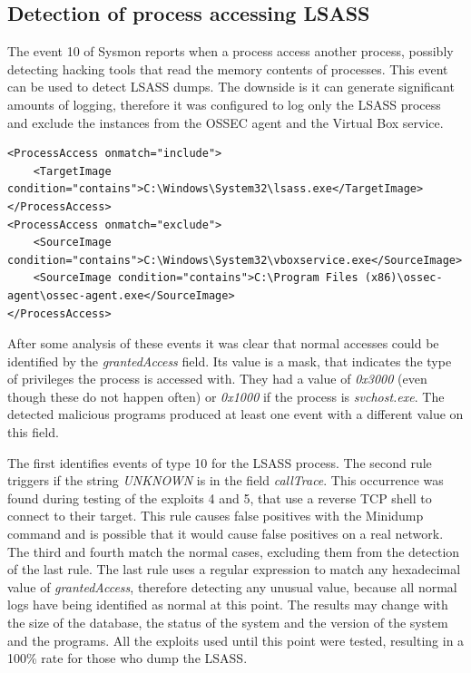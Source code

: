 \subsection{Detection of process accessing LSASS} \label{detect_lsass}
The event 10 of Sysmon reports when a process access another process, possibly detecting hacking tools that read the memory contents of processes\cite{sysmon}.
This event can be used to detect LSASS dumps\cite{sysmon_event_10_lsass}.
\linej
The downside is it can generate significant amounts of logging, therefore it was configured to log only the LSASS process and exclude the instances from the OSSEC agent and the Virtual Box service.
\linej
\begin{lstlisting}[style=xml,caption=Sysmon monitoring with event 10 for LSASS reads,captionpos=b]
<ProcessAccess onmatch="include">
	<TargetImage condition="contains">C:\Windows\System32\lsass.exe</TargetImage>
</ProcessAccess>
<ProcessAccess onmatch="exclude">
	<SourceImage condition="contains">C:\Windows\System32\vboxservice.exe</SourceImage>
	<SourceImage condition="contains">C:\Program Files (x86)\ossec-agent\ossec-agent.exe</SourceImage>
</ProcessAccess>
\end{lstlisting}
\linej
After some analysis of these events it was clear that normal accesses could be identified by the \textit{grantedAccess} field. Its value is a mask, that indicates the type of privileges the process is accessed with.
\linej
They had a value of \textit{0x3000} (even though these do not happen often) or \textit{0x1000} if the process is \textit{svchost.exe}. The detected malicious programs produced at least one event with a different value on this field.
\linej

\linej
The first identifies events of type 10 for the LSASS process.
\linej
The second rule triggers if the string \textit{UNKNOWN} is in the field \textit{callTrace}. This occurrence was found during testing of the exploits 4 and 5, that use a reverse TCP shell to connect to their target. This rule causes false positives with the Minidump command and is possible that it would cause false positives on a real network.
\linej
The third and fourth match the normal cases, excluding them from the detection of the last rule.
\linej
The last rule uses a regular expression to match any hexadecimal value of \textit{grantedAccess}, therefore detecting any unusual value, because all normal logs have being identified as normal at this point.
\linej
\linej
The results may change with the size of the database, the status of the system and the version of the system and the programs.
All the exploits used until this point were tested, resulting in a 100\% rate for those who dump the LSASS.

